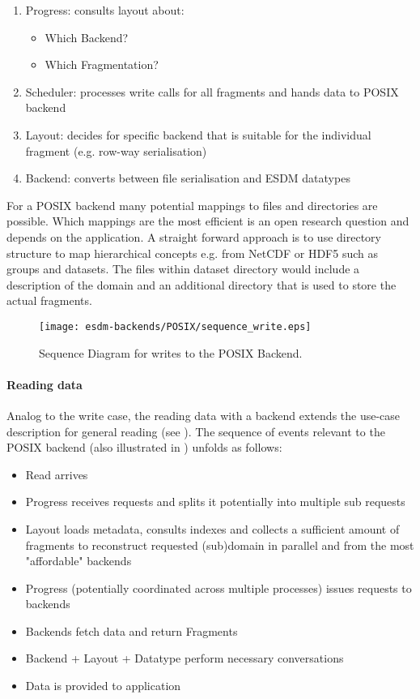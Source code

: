 \begin{enumerate}
	\item Progress: consults layout about:
	\begin{itemize}
		\item Which Backend?
		\item Which Fragmentation?
	\end{itemize}
	\item Scheduler: processes write calls for all fragments and hands data to POSIX backend
	\item Layout: decides for specific backend that is suitable for the individual fragment (e.g. row-way serialisation)
	\item Backend: converts between file serialisation and ESDM datatypes
\end{enumerate}

For a POSIX backend many potential mappings to files and directories are possible.
Which mappings are the most efficient is an open research question and depends on the application.
A straight forward approach is to use directory structure to map hierarchical concepts e.g. from NetCDF or HDF5 such as groups and datasets.
The files within dataset directory would include a description of the domain and an additional directory that is used to store the actual fragments.

\begin{figure}
	\centering
	\texttt{[image: esdm-backends/POSIX/sequence\_write.eps]}
	\caption{Sequence Diagram for writes to the POSIX Backend.}
	\label{fig:backend posix sequence write}
\end{figure}



\paragraph{Reading data}

Analog to the write case, the reading data with a backend extends the use-case description for general reading (see ).
The sequence of events relevant to the POSIX backend (also illustrated in ) unfolds as follows:

\begin{itemize}
	\item Read arrives
	\item Progress receives requests and splits it potentially into multiple sub requests
	\item Layout loads metadata, consults indexes and collects a sufficient amount of fragments to reconstruct requested (sub)domain in parallel and from the most "affordable" backends
	\item Progress (potentially coordinated across multiple processes) issues requests to backends
	\item Backends fetch data and return Fragments
	\item Backend + Layout + Datatype perform necessary conversations
	\item Data is provided to application
\end{itemize}



